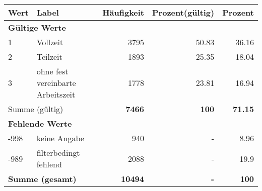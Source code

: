      \begin{longtable}{lXrrr}
     \toprule
     \textbf{Wert} & \textbf{Label} & \textbf{Häufigkeit} & \textbf{Prozent(gültig)} & \textbf{Prozent} \\
     \endhead
     \midrule
     \multicolumn{5}{l}{\textbf{Gültige Werte}}\\

     1 &
     \multicolumn{1}{X}{ Vollzeit   } &


       \num{3795} &
       \num[round-mode=places,round-precision=2]{50.83} &
         \num[round-mode=places,round-precision=2]{36.16} \\

     2 &
     \multicolumn{1}{X}{ Teilzeit   } &


       \num{1893} &
       \num[round-mode=places,round-precision=2]{25.35} &
         \num[round-mode=places,round-precision=2]{18.04} \\

     3 &
     \multicolumn{1}{X}{ ohne fest vereinbarte Arbeitszeit   } &


       \num{1778} &
       \num[round-mode=places,round-precision=2]{23.81} &
         \num[round-mode=places,round-precision=2]{16.94} \\
     \midrule
     \multicolumn{2}{l}{Summe (gültig)} &
       \textbf{\num{7466}} &
     \textbf{\num{100}} &
       \textbf{\num[round-mode=places,round-precision=2]{71.15}} \\
     \multicolumn{5}{l}{\textbf{Fehlende Werte}}\\
       -998 &
       keine Angabe &
         \num{940} &
        - &
         \num[round-mode=places,round-precision=2]{8.96} \\
       -989 &
       filterbedingt fehlend &
         \num{2088} &
        - &
         \num[round-mode=places,round-precision=2]{19.9} \\
     \midrule
     \multicolumn{2}{l}{\textbf{Summe (gesamt)}} &
          \textbf{\num{10494}} &
        \textbf{-} &
        \textbf{\num{100}} \\
     \bottomrule
     \end{longtable}
     
